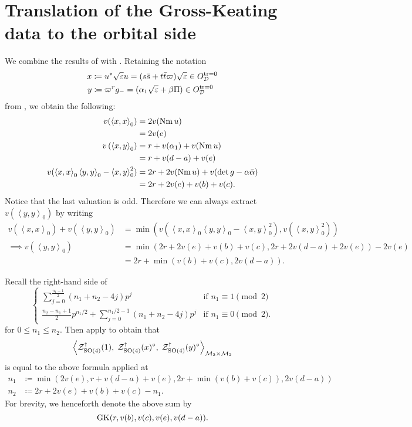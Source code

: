 \section{Translation of the Gross-Keating data to the orbital side}
We combine the results of  with .
Retaining the notation
\begin{align*}
  x &\coloneqq u^\ast \sqrt{\varepsilon} u = (s \bar s + t \bar t \varpi) \sqrt{\varepsilon} \in O_\mathcal D^{\operatorname{tr} = 0} \\
  y &\coloneqq \varpi^r g_- = (\alpha_1\sqrt{\varepsilon} + \beta \Pi) \in O_\mathcal D^{\operatorname{tr} = 0}
\end{align*}
from , we obtain the following:
\begin{align*}
  v(\left\langle x,x \right\rangle _0)
    &= 2 v(\operatorname{Nm} u) \\
    &= 2v(e) \\
  v\left( \left\langle x,y \right\rangle _0 \right)
    &= r + v(\alpha_1) + v(\operatorname{Nm} u) \\
    &= r + v(d-a) + v(e) \\
  v(
    \left\langle x,x \right\rangle _0 \left\langle y,y \right\rangle _0
    - \left\langle x,y \right\rangle^2_0
  )
    &= 2r + 2 v(\operatorname{Nm} u) + v(\det g - \alpha \bar \alpha) \\
    &= 2r + 2v(e) + v(b) + v(c).
\end{align*}
Notice that the last valuation is odd.
Therefore we can always extract $v(\left\langle y,y \right\rangle _0)$ by writing
\begin{align*}
  v\left(\left\langle x,x \right\rangle _0\right) + v\left(\left\langle y,y \right\rangle _0\right)
  &= \min \left( v\left( \left\langle x,x \right\rangle _0 \left\langle y,y \right\rangle _0 - \left\langle x,y \right\rangle^2_0 \right),
    v(\left\langle x,y \right\rangle^2_0) \right) \\
  \implies  v\left(\left\langle y,y \right\rangle _0\right)
  &= \min(2r + 2v(e) + v(b) + v(c), 2r + 2v(d-a) + 2v(e)) - 2v(e) \\
  &= 2r + \min(v(b) + v(c), 2v(d-a)).
\end{align*}

Recall the right-hand side of
\[
  \begin{cases}
    \sum_{j=0}^{\frac{n_1-1}{2}} (n_1+n_2-4j) p^j & \text{if } n_1 \equiv 1 \pmod 2 \\
    \frac{n_2-n_1+1}{2} p^{n_1/2} + \sum_{j=0}^{n_1/2-1} (n_1+n_2-4j) p^j & \text{if } n_1 \equiv 0 \pmod 2.
  \end{cases}
\]
for $0 \le n_1 \le n_2$.
Then apply  to obtain that
\[
  \left< \mathcal Z^{\dagger}_{\operatorname{SO}(4)}(1), \; \mathcal Z^{\dagger}_{\operatorname{SO}(4)}(x)^\circ, \; \mathcal Z^{\dagger}_{\operatorname{SO}(4)}(y)^\circ \right>_{\mathcal M_2 \times \mathcal M_2}
\]
is equal to the above formula applied at
\begin{align*}
  n_1 &\coloneqq \min(2v(e), r+v(d-a)+v(e), 2r+\min(v(b)+v(c)), 2v(d-a)) \\
  n_2 &\coloneqq 2r + 2v(e) + v(b) + v(c) - n_1.
\end{align*}
For brevity, we henceforth denote the above sum by
\[ \operatorname{GK}(r, v(b), v(c), v(e), v(d-a)). \]

